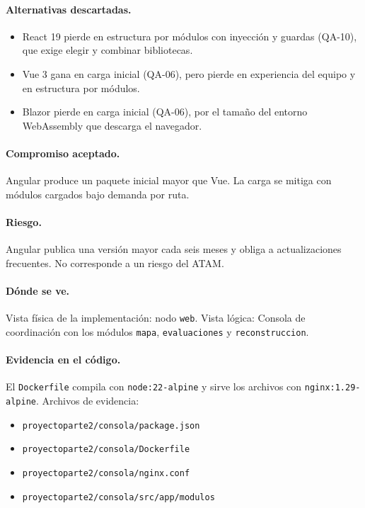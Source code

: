 \paragraph{Alternativas descartadas.}
\begin{itemize}
  \item React 19 pierde en estructura por módulos con inyección y guardas (QA-10), que exige elegir y combinar bibliotecas.
  \item Vue 3 gana en carga inicial (QA-06), pero pierde en experiencia del equipo y en estructura por módulos.
  \item Blazor pierde en carga inicial (QA-06), por el tamaño del entorno WebAssembly que descarga el navegador.
\end{itemize}

\paragraph{Compromiso aceptado.} Angular produce un paquete inicial mayor que Vue.
La carga se mitiga con módulos cargados bajo demanda por ruta.

\paragraph{Riesgo.} Angular publica una versión mayor cada seis meses y obliga a actualizaciones frecuentes.
No corresponde a un riesgo del ATAM.

\paragraph{Dónde se ve.} Vista física de la implementación: nodo \texttt{web}.
Vista lógica: Consola de coordinación con los módulos \texttt{mapa}, \texttt{evaluaciones} y \texttt{reconstruccion}.

\paragraph{Evidencia en el código.} El \texttt{Dockerfile} compila con \texttt{node:22-alpine} y sirve los archivos con \texttt{nginx:1.29-alpine}.
Archivos de evidencia:
{\raggedright
\begin{itemize}
  \item \texttt{proyectoparte2/\br{}consola/\br{}package.json}
  \item \texttt{proyectoparte2/\br{}consola/\br{}Dockerfile}
  \item \texttt{proyectoparte2/\br{}consola/\br{}nginx.conf}
  \item \texttt{proyectoparte2/\br{}consola/\br{}src/\br{}app/\br{}modulos}
\end{itemize}
\par}

